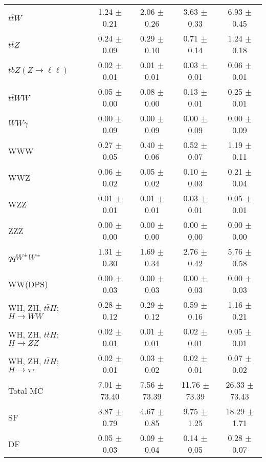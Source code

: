 \begin{tabular}{l|cccc}
                   $t\overline{t}W$ &  1.24 $\pm$  0.21 &  2.06 $\pm$  0.26 &  3.63 $\pm$  0.33 &  6.93 $\pm$  0.45 \\
                   $t\overline{t}Z$ &  0.24 $\pm$  0.09 &  0.29 $\pm$  0.10 &  0.71 $\pm$  0.14 &  1.24 $\pm$  0.18 \\
    $tbZ (Z \rightarrow \ell \ell)$ &  0.02 $\pm$  0.01 &  0.01 $\pm$  0.01 &  0.03 $\pm$  0.01 &  0.06 $\pm$  0.01 \\
                  $t\overline{t}WW$ &  0.05 $\pm$  0.00 &  0.08 $\pm$  0.00 &  0.13 $\pm$  0.01 &  0.25 $\pm$  0.01 \\
                         $WW\gamma$ &  0.00 $\pm$  0.09 &  0.00 $\pm$  0.09 &  0.00 $\pm$  0.09 &  0.00 $\pm$  0.09 \\
                                WWW &  0.27 $\pm$  0.05 &  0.40 $\pm$  0.06 &  0.52 $\pm$  0.07 &  1.19 $\pm$  0.11 \\
                                WWZ &  0.06 $\pm$  0.02 &  0.05 $\pm$  0.02 &  0.10 $\pm$  0.03 &  0.21 $\pm$  0.04 \\
                                WZZ &  0.01 $\pm$  0.01 &  0.01 $\pm$  0.01 &  0.03 $\pm$  0.01 &  0.05 $\pm$  0.01 \\
                                ZZZ &  0.00 $\pm$  0.00 &  0.00 $\pm$  0.00 &  0.00 $\pm$  0.00 &  0.00 $\pm$  0.00 \\
                 $qqW^{\pm}W^{\pm}$ &  1.31 $\pm$  0.30 &  1.69 $\pm$  0.34 &  2.76 $\pm$  0.42 &  5.76 $\pm$  0.58 \\
                            WW(DPS) &  0.00 $\pm$  0.03 &  0.00 $\pm$  0.03 &  0.00 $\pm$  0.03 &  0.00 $\pm$  0.03 \\
WH, ZH, $t\bar{t}H$; $H \rightarrow WW$ &  0.28 $\pm$  0.12 &  0.29 $\pm$  0.12 &  0.59 $\pm$  0.16 &  1.16 $\pm$  0.21 \\
WH, ZH, $t\bar{t}H$; $H \rightarrow ZZ$ &  0.02 $\pm$  0.01 &  0.01 $\pm$  0.01 &  0.02 $\pm$  0.01 &  0.05 $\pm$  0.01 \\
WH, ZH, $t\bar{t}H$; $H \rightarrow \tau\tau$ &  0.02 $\pm$  0.01 &  0.03 $\pm$  0.02 &  0.02 $\pm$  0.01 &  0.07 $\pm$  0.02 \\
\hline\hline
                           Total MC &  7.01 $\pm$ 73.40 &  7.56 $\pm$ 73.39 & 11.76 $\pm$ 73.39 & 26.33 $\pm$ 73.43 \\
\hline
                                 SF &  3.87 $\pm$  0.79 &  4.67 $\pm$  0.85 &  9.75 $\pm$  1.25 & 18.29 $\pm$  1.71 \\
                                 DF &  0.05 $\pm$  0.03 &  0.09 $\pm$  0.04 &  0.14 $\pm$  0.05 &  0.28 $\pm$  0.07 \\

\end{tabular}
